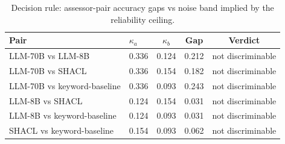 \begin{table}[htbp]
\centering
\caption{Decision rule: assessor-pair accuracy gaps vs noise band implied by the reliability ceiling.}
\label{tab:decision_rule}
\begin{tabular}{llccc}
\toprule
Pair & $\kappa_a$ & $\kappa_b$ & Gap & Verdict \\
\midrule
LLM-70B vs LLM-8B & 0.336 & 0.124 & 0.212 & not discriminable \\
LLM-70B vs SHACL & 0.336 & 0.154 & 0.182 & not discriminable \\
LLM-70B vs keyword-baseline & 0.336 & 0.093 & 0.243 & not discriminable \\
LLM-8B vs SHACL & 0.124 & 0.154 & 0.031 & not discriminable \\
LLM-8B vs keyword-baseline & 0.124 & 0.093 & 0.031 & not discriminable \\
SHACL vs keyword-baseline & 0.154 & 0.093 & 0.062 & not discriminable \\
\bottomrule
\end{tabular}
\end{table}
